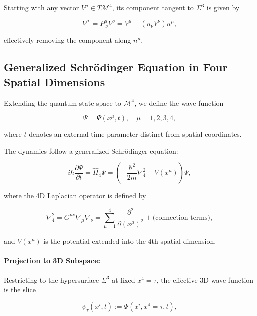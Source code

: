 \documentclass[12pt,a4paper]{article}
\numberwithin{equation}{section}
\begin{document}
Starting with any vector \(V^\mu \in T\mathcal{M}^4\), its component tangent to \(\Sigma^3\) is given by

\[
V^\mu_\perp = P^\mu_{\ \nu} V^\nu = V^\mu - (n_\nu V^\nu) n^\mu,
\]

effectively removing the component along \(n^\mu\).

\subsection{Generalized Schrödinger Equation in Four Spatial Dimensions}

Extending the quantum state space to \(\mathcal{M}^4\), we define the wave function

\begin{equation}
    \Psi = \Psi(x^\mu, t), \quad \mu = 1,2,3,4,
\end{equation}

where \(t\) denotes an external time parameter distinct from spatial coordinates.

The dynamics follow a generalized Schrödinger equation:

\begin{equation}
    i\hbar \frac{\partial \Psi}{\partial t} = \hat{H}_4 \Psi = \left( -\frac{\hbar^2}{2m} \nabla_4^2 + V(x^\mu) \right) \Psi,
    \label{eq:4d_schrodinger_equation}
\end{equation}

where the 4D Laplacian operator is defined by

\begin{equation}
    \nabla_4^2 = G^{\mu\nu} \nabla_\mu \nabla_\nu = \sum_{\mu=1}^4 \frac{\partial^2}{\partial (x^\mu)^2} + \text{(connection terms)},
\end{equation}

and \(V(x^\mu)\) is the potential extended into the 4th spatial dimension.

\paragraph{Projection to 3D Subspace:}

Restricting to the hypersurface \(\Sigma^3\) at fixed \(x^4 = \tau\), the effective 3D wave function is the slice

\begin{equation}
    \psi_\tau(x^i, t) := \Psi(x^i, x^4 = \tau, t),
    \label{eq:3d_wavefunction_slice}
\end{equation}
\end{document}
